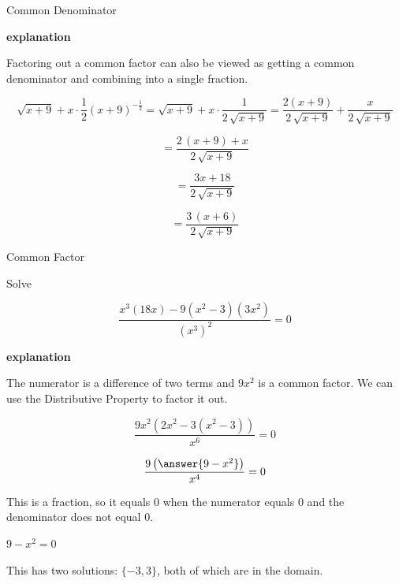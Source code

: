 \documentclass{ximera}
\begin{document}
\begin{example}  Common Denominator


\textbf{\textcolor{red!75!green}{explanation}} 


Factoring out a common factor can also be viewed as getting a common denominator and combining into a single fraction. 


\[
\sqrt{x+9} + x \cdot \frac{1}{2} (x+9)^{-\tfrac{1}{2}} = \sqrt{x+9} + x \cdot \frac{1}{2 \, \sqrt{x+9}} = \frac{2(x+9)}{2 \, \sqrt{x+9}} +  \frac{x}{2 \, \sqrt{x+9}}   
\]


\[
= \frac{2 \, (x + 9) + x}{2 \, \sqrt{x+9}}   
\]


\[
= \frac{3x + 18}{2 \, \sqrt{x+9}}   
\]


\[
= \frac{3 \, (x + 6)}{2 \, \sqrt{x+9}}   
\]



\end{example}









\begin{example}  Common Factor


Solve 

\[  \frac{x^3 (18x) - 9(x^2-3)(3x^2)}{(x^3)^2} = 0 \]



\textbf{\textcolor{red!75!green}{explanation}} 

The numerator is a difference of two terms and $9 x^2$ is a common factor.  We can use the Distributive Property to factor it out.



\[  \frac{9x^2 (2x^2 - 3(x^2-3))}{x^6} = 0  \]


\[  \frac{9 \left( \answer{9 - x^2} \right)}{x^4} = 0 \]



This is a fraction, so it equals $0$ when the numerator equals $0$ and the denominator does not equal $0$.


$9 - x^2 = 0$

This has two solutions: $\{ -3, 3  \}$, both of which are in the domain.







\end{example}
\end{document}
